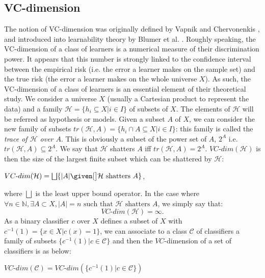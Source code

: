 \documentclass{ecai}
\begin{document}

\subsection{VC-dimension}\label{vcdim}
The notion of VC-dimension was originally defined by Vapnik and Chervonenkis \cite{Vapnik1998}, and introduced into learnability theory by Blumer et al. \cite{Blumer1989}. Roughly speaking, the VC-dimension of a class of learners is a numerical measure of their discrimination power. It appears that this number is strongly linked to the confidence interval between the empirical risk (i.e. the error a learner makes on the sample set) and the true risk (the error a learner makes on the whole universe $X$). As such, the VC-dimension of a class of learners is an essential element of their theoretical study.
We consider a universe $X$ (usually a Cartesian product to represent the data) and a
family $\mathcal{H}=\{h_i \subseteq X|i \in I\}$ of subsets of $X$.
The elements of $\mathcal{H}$ will be referred as hypothesis or models.
Given a subset $A$
of $X$, we can consider the new family of subsets $tr(\mathcal{H},A) = \{h_i \cap A \subseteq X|i \in I\}$: this family is called the {\it trace of $\mathcal{H}$ over $A$}. This is obviously a subset
of the power set of $A$, $2^A$ i.e. $tr(\mathcal{H},A) \subseteq 2^A$.
We say that $\mathcal{H}$ shatters $A$ iff $tr(\mathcal{H},A)=2^A$.
$VC\mbox{-}dim(\mathcal{H})$ is then the size of the largest finite subset which can be shattered by $\mathcal{H}$:
\begin{defi}
  $VC\mbox{-}dim(\mathcal{H}) = \bigsqcup \{|A| \given[\big] \mathcal{H} \mbox{ shatters } A
\}$,
\end{defi}
where $\bigsqcup$ is the least upper bound operator.
In the case where $\forall n \in\mathbb{N}, \exists  A \subset X, |A|=n \mbox{ such
that } \mathcal{H} \mbox{ shatters } A$, we simply say that:
$$VC\mbox{-}dim(\mathcal{H})=\infty.$$
\noindent
As a binary classifier $c$ over $X$ defines a subset of $X$ with $c^{-1}(1)=\{x \in X | c(x)=1\}$, we can associate to a class $\mathcal{C}$ of classifiers a family of subsets
$\{c^{-1}(1) | c \in \mathcal{C}\}$ and then the $VC\mbox{-}$dimension of a set of classifiers is as below:
\begin{defi}
$VC\mbox{-}dim(\mathcal{C})=VC\mbox{-}dim(\{c^{-1}(1) | c \in \mathcal{C}\})$
\end{defi}
\end{document}
